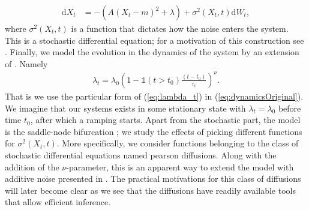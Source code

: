 \begin{align}
    \mathrm{d}X_t &= -\left(A\left(X_t - m\right)^2 + \lambda\right) + \sigma^2(X_t, t)\mathrm{d}W_t, \label{eq:dynamicsOriginal}
\end{align}
where $\sigma^2(X_t, t)$ is a function that dictates how the noise enters the system. This is a stochastic differential equation; for a motivation of this construction see \cite[Chapter 3.1-3.2]{Srkk2019}. Finally, we model the evolution in the dynamics of the system by an extension of \cite[Equation (2)]{Ditlevsen2023}. Namely
\begin{align}
    \lambda_t = \lambda_0\left(1 - \mathds{1}\left(t>t_0\right)\frac{\left(t - t_0\right)}{\tau_c}\right)^\nu \label{eq:lambda_t}.
\end{align}
That is we use the particular form of (\ref{eq:lambda_t}) in (\ref{eq:dynamicsOriginal}). We imagine that our systems exists in some stationary state with $\lambda_t = \lambda_0$ before time $t_0$, after which a ramping starts. Apart from the stochastic part, the model is the saddle-node bifurcation \cite{Strogatz2019_gv}; we study the effects of picking different functions for $\sigma^2(X_t, t)$. More specifically, we consider functions belonging to the class of stochastic differential equations named pearson diffusions. Along with the addition of the $\nu$-parameter, this is an apparent way to extend the model with additive noise presented in \cite[equation (1)]{Ditlevsen2023}. The practical motivations for this class of diffusions will later become clear as we see that the diffusions have readily available tools that allow efficient inference.
